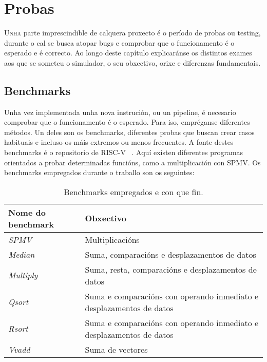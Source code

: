 \chapter{Probas}
\label{chap:probas}

\lettrine{U}{nha} parte imprescindible de calquera proxecto é o período de probas ou testing, durante o cal se busca atopar bugs e comprobar que o funcionamento é o esperado e é correcto. Ao longo deste capítulo explicaránse os distintos exames aos que se someteu o simulador, o seu obxectivo, orixe e diferenzas fundamentais.

\section{Benchmarks}\label{sec:benchmarks}
Unha vez implementada unha nova instrución, ou un pipeline, é necesario comprobar que o funcionamento é o esperado. Para iso, empréganse diferentes métodos. Un deles son os benchmarks, diferentes probas que buscan crear casos habituais e incluso os máis extremos ou menos frecuentes. A fonte destes benchmarks é o repositorio de RISC-V ~\cite{riscv_tests}. Aquí existen diferentes programas orientados a probar determinadas funcións, como a multiplicación con SPMV. Os benchmarks empregados durante o traballo son os seguintes:
\begin{table}[hp!]
  \centering
  \begin{tabular}{|p{5cm}|p{8cm}|}
    \rowcolor{udcpink!25}
    \textbf{Nome do benchmark} & \textbf{Obxectivo} \\\hline
    \textit{SPMV} & Multiplicacións \\
    \textit{Median} & Suma, comparacións e desplazamentos de datos \\
    \textit{Multiply} & Suma, resta, comparacións e desplazamentos de datos \\
    \textit{Qsort} & Suma e comparacións con operando inmediato e desplazamentos de datos \\
    \textit{Rsort} & Suma e comparacións con operando inmediato e desplazamentos de datos \\
    \textit{Vvadd} & Suma de vectores\\
  \end{tabular}
  \caption{Benchmarks empregados e con que fin.}
  \label{tab:benchmarks}
\end{table}

